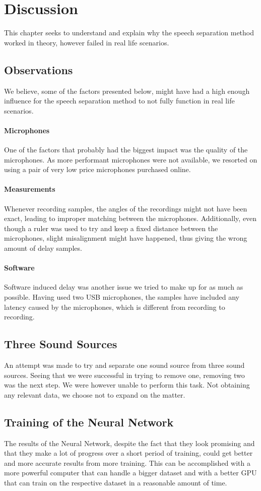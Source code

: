 \chapter{Discussion}\label{ch:discussion}
This chapter seeks to understand and explain why the speech separation method worked in theory,
however failed in real life scenarios.
\section{Observations}
We believe, some of the factors presented below, might have had a high enough influence for the speech 
separation method to not fully function in real life scenarios.
\subsubsection{Microphones}
One of the factors that probably had the biggest impact was the quality of the microphones. As more
performant microphones were not available, we resorted on using a pair of very low price microphones
purchased online.
\subsubsection{Measurements}
Whenever recording samples, the angles of the recordings might not have been exact, leading to improper 
matching between the microphones. Additionally, even though a ruler was used to try and keep a fixed 
distance between the microphones, slight misalignment might have happened, thus giving the wrong
amount of delay samples.
\subsubsection{Software}
Software induced delay was another issue we tried to make up for as much as possible. Having used two USB 
microphones, the samples have included any latency caused by the microphones, which is different from 
recording to recording.\cite{USBLATENCY}
\newpage
\section{Three Sound Sources} 
An attempt was made to try and separate one sound source from three sound sources. Seeing
that we were successful in trying to remove one, removing two was the next step.
We were however unable to perform this task. Not obtaining any relevant data, we choose not 
to expand on the matter.

\section{Training of the Neural Network}
The results of the Neural Network, despite the fact that they look promising and that they make a lot of progress over a short period of training, could get better and more accurate results from more training. This can be accomplished with a more powerful computer that can handle a bigger dataset and with a better GPU that can train on the respective dataset in a reasonable amount of time. 